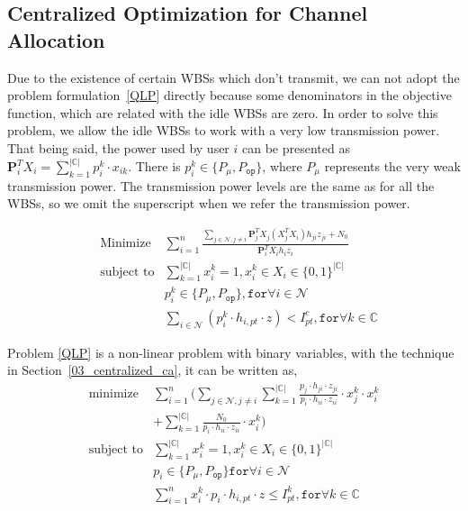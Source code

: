 \documentclass[times]{ettauth}
\theoremstyle{mytheoremstyle}
\theoremstyle{mytheoremstyle}
\theoremstyle{mytheoremstyle}
\renewcommand{\vec}[1]{\mathbf{#1}}
\begin{document}
\subsection{Centralized Optimization for Channel Allocation}
Due to the existence of certain WBSs which don't transmit, we can not adopt the problem formulation~\ref{QLP} directly because some denominators in the objective function, which are related with the idle WBSs are zero.
In order to solve this problem, we allow the idle WBSs to work with a very low transmission power.
That being said, the power used by user $i$ can be presented as $\vec{P}_i^T X_i = \sum\limits_{k=1}^{|\mathbb{C}|}p_i^k\cdot x_{ik}$.
There is $p_i^k\in \{P_\mu, P_{\mathtt{op}}\}$, where $P_\mu$ represents the very weak transmission power.
The transmission power levels are the same as for all the WBSs, so we omit the superscript when we refer the transmission power.

	\begin{equation}
\label{QLP}
		\begin{aligned}
		& \underset{}{\text{Minimize}}
		&  \sum\limits^{n}_{i=1} \frac{\sum\limits_{j\in\mathcal{N}, j\neq i}\vec{P}_j^TX_j(X_j^TX_i)h_{ji}z_{ji} + N_0}{\vec{P}_i^TX_ih_iz_i}\\
		& \text{subject to}
		&  \sum\limits_{k=1}^{|\mathbb{C}|}x_i^k=1, x_i^k\in X_i\in \{0,1\}^{|\mathbb{C}|}\\
		& & p_i^k\in \{P_\mu, P_{\mathtt{op}}\}, \mathtt{for} \forall i\in \mathcal{N}\\
     	& & \sum_{i\in \mathcal{N}} (p^k_i \cdot h_{i,pt}\cdot z) < I^c_{pt},  \mathtt{for} \forall k\in \mathbb{C} 
		\end{aligned}
	\end{equation}
	
Problem \ref{QLP} is a non-linear problem with binary variables, with the technique in Section~\ref{03_centralized_ca}, it can be written as,
	\begin{equation}
\label{QLP_2}
			\begin{aligned}
			\underset{}{\text{minimize}}
			& \sum\limits^{n}_{i=1} ( \sum\limits_{j\in\mathcal{N}, j\neq i}\sum\limits_{k=1}^{|\mathbb{C}|} \frac{p_j\cdot h_{ji}\cdot z_{ji}}{p_i\cdot h_{ii}\cdot z_{ii}}\cdot  x_j^k\cdot x_i^k  \\
			& + \sum\limits_{k=1}^{|\mathbb{C}|} \frac{N_0}{p_i\cdot h_{ii}\cdot z_{ii}}\cdot x_i^k)\\
			\text{subject to} 
			& \sum\limits_{k=1}^{|\mathbb{C}|}x_i^k=1, x_i^k\in X_i\in \{0,1\}^{|\mathbb{C}|}\\
			& p_i\in \{P_\mu, P_{\mathtt{op}}\} \mathtt{for} \forall i\in \mathcal{N}\\
			& \sum\limits^{n}_{i=1}x_i^k\cdot p_i\cdot h_{i,pt}\cdot z \leq I^k_{pt}, \mathtt{for}\forall k\in \mathbb{C} \\
			\end{aligned}
		\end{equation}
		
\end{document}
